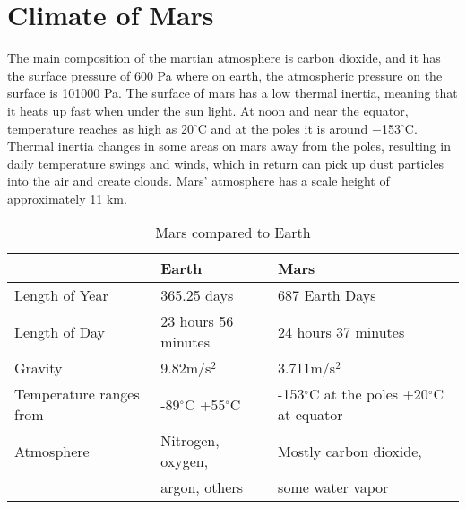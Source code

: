 \section{Climate of Mars}
The main composition of the martian atmosphere is carbon dioxide, and it has the surface pressure of 600 Pa where on earth, the atmospheric pressure on the surface is 101000 Pa.
\newline The surface of mars has a low thermal inertia, meaning that it heats up fast when under the sun light. At noon and near the equator, temperature reaches as high as 20$^{\circ}$C and at the poles it is around −153$^{\circ}$C. Thermal inertia changes in some areas on mars away from the poles, resulting in daily temperature swings and winds, which in return can pick up dust particles into the air and create clouds. Mars' atmosphere has a scale height of approximately 11 km\cite{climate}.
\begin{table} [h]
    \centering
    \begin{tabu} to 1\textwidth { | X[c] X[c] X[c] | }
     \hline
      & Earth & Mars \\ 
     \hline
     Length of Year & 365.25 days & 687 Earth Days \\
     \hline
     Length of Day & 23 hours 56 minutes & 24 hours 37 minutes \\
     \hline
     Gravity & 9.82m/s$^2$ & 3.711m/s$^2$ \\
     \hline
     Temperature ranges from & -89$^{\circ}$C +55$^{\circ}$C &-153$^{\circ}$C at the poles +20$^{\circ}$C at equator \\
     \hline
     Atmosphere & Nitrogen, oxygen, & Mostly carbon dioxide, \\
      & argon, others & some water vapor \\
     \hline
    \end{tabu}
    \caption{Mars compared to Earth\cite{MarsVSEarth}}
    \label{tab:marsEarthFacts}
\end{table}

